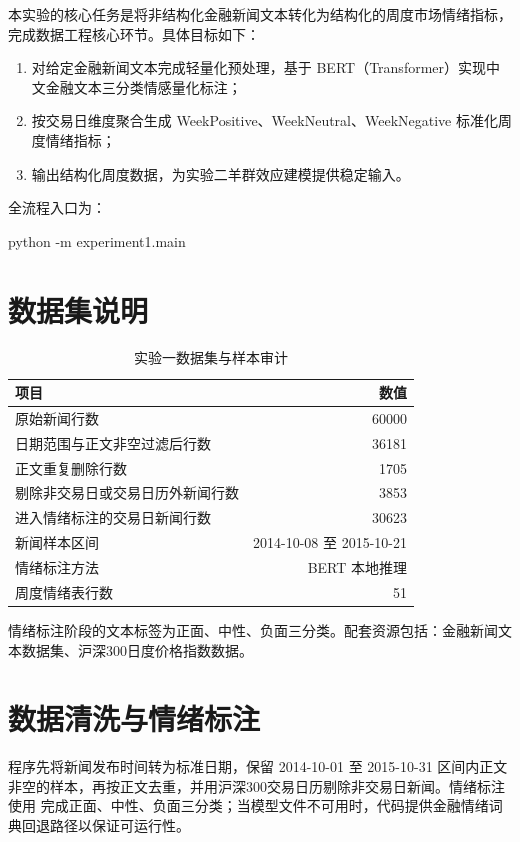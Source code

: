\documentclass[UTF8,a4paper,12pt]{ctexart}
\begin{document}
本实验的核心任务是将非结构化金融新闻文本转化为结构化的周度市场情绪指标，完成数据工程核心环节。具体目标如下：

\begin{enumerate}
    \item 对给定金融新闻文本完成轻量化预处理，基于 BERT（Transformer）实现中文金融文本三分类情感量化标注；
    \item 按交易日维度聚合生成 WeekPositive、WeekNeutral、WeekNegative 标准化周度情绪指标；
    \item 输出结构化周度数据，为实验二羊群效应建模提供稳定输入。
\end{enumerate}

全流程入口为：
\begin{CodeBlock}
python -m experiment1.main
\end{CodeBlock}

\section{数据集说明}

\begin{table}[H]
\centering
\caption{实验一数据集与样本审计}
\begin{tabular}{lr}
\toprule
项目 & 数值 \\
\midrule
原始新闻行数 & 60000 \\
日期范围与正文非空过滤后行数 & 36181 \\
正文重复删除行数 & 1705 \\
剔除非交易日或交易日历外新闻行数 & 3853 \\
进入情绪标注的交易日新闻行数 & 30623 \\
新闻样本区间 & 2014-10-08 至 2015-10-21 \\
情绪标注方法 & BERT 本地推理 \\
周度情绪表行数 & 51 \\
\bottomrule
\end{tabular}
\end{table}

情绪标注阶段的文本标签为正面、中性、负面三分类。配套资源包括：金融新闻文本数据集、沪深300日度价格指数数据。

\section{数据清洗与情绪标注}

程序先将新闻发布时间转为标准日期，保留 2014-10-01 至 2015-10-31 区间内正文非空的样本，再按正文去重，并用沪深300交易日历剔除非交易日新闻。情绪标注使用  完成正面、中性、负面三分类；当模型文件不可用时，代码提供金融情绪词典回退路径以保证可运行性。
\end{document}
